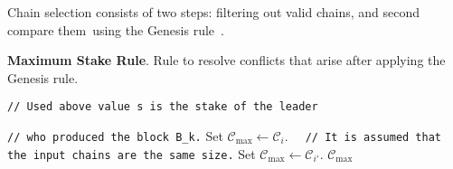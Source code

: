 Chain selection consists of two steps: filtering out valid chains, and second compare them\
using the Genesis rule~\cite{Badertscher2018}.

\bigbreak
\noindent
{}
\textbf{Maximum Stake Rule}.\label{apndx:max-stake-rule}
Rule to resolve conflicts that arise after applying the Genesis rule.
\begin{algo}
    \caption{${\textsf{maxStakeChain}(\mathcal{C}_i}, \mathcal{C}_{i'})$}
    \begin{algorithmic}[1]

            \noindent
            \lstinline|// Used above value s is the stake of the leader|

            \noindent
            \lstinline|// who produced the block B_k.|
            \State Set ${\mathcal{C}_{\max} \leftarrow \mathcal{C}_{i}}$.
        \Else
            \noindent
            \lstinline|  // It is assumed that the input chains are the same size.|
            \State Set ${\mathcal{C}_{\max} \leftarrow \mathcal{C}_{i'}}$.
        \EndIf
        \State \Return ${\mathcal{C}_{\max}}$
    \end{algorithmic}\label{alg:max-stake-rule}
\end{algo}

